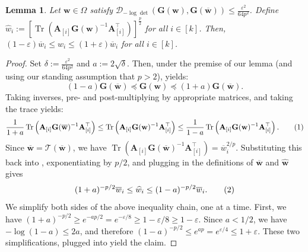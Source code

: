 \documentclass[11pt]{article}
\newcommand\numberthis{\addtocounter{equation}{1}\tag{\theequation}}
\theoremstyle{plain}
\newtheorem{lemma}[lemma]{Lemma}
\numberwithin{equation}{section}
\newcommand{\Tr}{\operatorname{Tr}}
\newcommand{\eps}{\varepsilon}
\newcommand{\bG}{\mathbf{G}}
\newcommand{\bw}{\mathbf{w}}
\newcommand{\bwbar}{\overline{\mathbf{w}}}
\newcommand{\bAblk}[1]{\mathbf{A}_{[#1]}}
\newcommand{\what}{\widehat{w}}
\newcommand{\wbar}{\overline{w}}
\newcommand{\calT}{\mathcal{T}}
\newcommand{\logdetdiv}[2]{\mathcal{D}_{-\log\det}\left(#1, #2\right)}
\begin{document}
\begin{lemma}
\label{lem:coordinatewise-approx}
Let $\bw\in\Omega$ satisfy $\logdetdiv{\bG(\bw)}{\bG(\bwbar)}\leq \frac{\eps^2}{64p^2}$. Define $\what_i := \left[\Tr\left(\bAblk{i}\bG(\bw)^{-1}\bAblk{i}^\top\right)\right]^{\frac{p}{2}}$ for all $i \in [k]$. Then, $(1-\eps)\wbar_i \leq \what_i \leq (1+\eps)\wbar_i$ for all $i \in [k]$.
\end{lemma}
\begin{proof}
Set $\delta := \frac{\eps^2}{64p^2}$ and $a:= 2\sqrt{\delta}$. Then, under the premise of our lemma (and using our standing assumption that $p>2$), \cite[Lemma~20]{pmlr-v336-gribling26a} yields: \[(1-a)\bG(\bwbar)\preceq \bG(\bw)\preceq (1+a) \bG(\bwbar).\] Taking inverses, pre- and post-multiplying  by appropriate matrices, and taking the trace yields: \[\frac{1}{1+a}\Tr\left(\bAblk{i}\bG(\bwbar)^{-1}\bAblk{i}^\top\right)\leq \Tr\left(\bAblk{i}\bG(\bw)^{-1}\bAblk{i}^\top\right)\leq \frac{1}{1-a}\Tr\left(\bAblk{i}\bG(\bw)^{-1}\bAblk{i}^\top\right).\numberthis\label{eq:coord1}\] Since $\bwbar= \calT(\bwbar)$, we have $\Tr\left(\bAblk{i}\bG(\bwbar)^{-1}\bAblk{i}^\top\right) = \wbar_i^{2/p}.$ Substituting this back into , exponentiating by $p/2$, and plugging in the definitions of $\bwbar$ and $\widehat{\bw}$ gives
\[(1+a)^{-p/2}\wbar_i\leq \what_i \leq (1-a)^{-p/2}\wbar_i.\numberthis\label{eq:coord2}\]
We simplify both sides of the above inequality chain, one at a time. First, we have $(1+a)^{-p/2} \geq e^{-ap/2} = e^{-\varepsilon/8}\geq 1-\varepsilon/8\geq 1-\varepsilon.$ Since $a<1/2$, we have $-\log(1-a)\leq 2a$, and therefore $(1-a)^{-p/2} \leq e^{ap} =e^{\eps/4} \leq 1+\eps$.  These two simplifications, plugged into  yield the claim.  
\end{proof}
\end{document}

